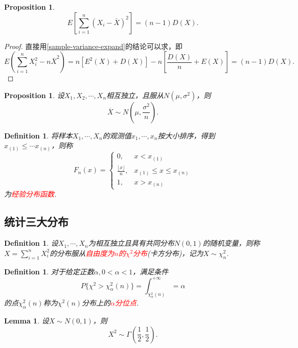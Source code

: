 \documentclass{article}
\newtheorem{lemma}[theorem]{Lemma}
\newtheorem{proposition}[theorem]{Proposition}
\newtheorem{definition}[theorem]{Definition}
\newcommand{\redt}[1]{\textcolor{red}{#1}}
\begin{document}
\begin{proposition}
\rm 
$$
E\left[ \sum\limits_{i = 1}^n  (X_i - \overline{X})^2 \right] = (n-1)D(X).
$$
\end{proposition}

\begin{proof}
\rm 直接用\ref{sample-variance-expand}的结论可以求，即
$$
E(\sum\limits_{i = 1}^n X_i^2  - n\overline{X}^2) = n\left[E^2(X) + D(X)\right]- n\left[\frac{D(X)}{n} + E(X)\right] = (n-1)D(X). 
$$
\end{proof}

\begin{proposition}\label{sample-mean-distribution}
\rm 设$X_1,X_2,\cdots,X_n$相互独立，且服从$N(\mu,\sigma^2)$，则
$$
\overline{X} \sim N(\mu,\frac{\sigma^2}{n}).
$$
\end{proposition}

\begin{definition}
\rm 将样本$X_1,\cdots,X_n$的观测值$x_1,\cdots,x_n$按大小排序，得到$x_{(1)} \leq \cdots x_{(n)}$，则称
$$
F_n(x) = \left\{
\begin{array}{ll}
0, & x <x_{(1)} \\
\frac{\lfloor x \rfloor}{n}, &  x_{(1)}\leq x \leq x_{(n)}\\
1, &x > x_{(n)}
\end{array} \right.
$$
为\redt{经验分布函数}.
\end{definition}

\subsection{统计三大分布}

\begin{definition}
\rm 设$X_1,\cdots,X_n$为相互独立且具有共同分布$N(0,1)$的随机变量，则称$X=\sum\limits_{i=1}^n X_i^2$的分布服从\redt{自由度为$n$的$\chi ^2$分布}(卡方分布)，记为$X \sim \chi_n^2$.
\end{definition}

\begin{definition}
\rm 对于给定正数$\alpha, 0 <\alpha <1$，满足条件
$$
P\{\chi^2 > \chi_\alpha^2(n)\} = \int_{\chi_\alpha^2(n)}^{+\infty} = \alpha
$$
的点$\chi_\alpha^2(n)$称为$\chi^2(n)$分布上的\redt{$\alpha$分位点}. 
\end{definition}

\begin{lemma}\label{for-chi-proof}
\rm 设$X \sim N(0,1)$，则
$$
X^2 \sim \Gamma(\frac{1}{2},\frac{1}{2}). 
$$
\end{lemma}
\end{document}
